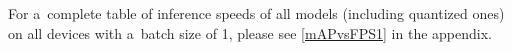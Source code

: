For a~complete table of inference speeds of all models (including quantized
ones) on all devices with a~batch size of 1, please see \autoref{mAPvsFPS1} in
the appendix.



